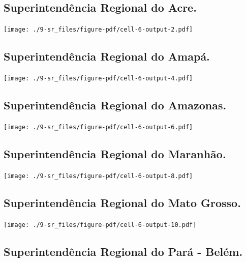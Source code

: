 \documentclass[
  letterpaper,
]{report}
\begin{document}
\hypertarget{superintenduxeancia-regional-do-acre.-1}{%
\subsection{Superintendência Regional do
Acre.}\label{superintenduxeancia-regional-do-acre.-1}}

\texttt{[image: ./9-sr\_files/figure-pdf/cell-6-output-2.pdf]}

\hypertarget{superintenduxeancia-regional-do-amapuxe1.-1}{%
\subsection{Superintendência Regional do
Amapá.}\label{superintenduxeancia-regional-do-amapuxe1.-1}}

\texttt{[image: ./9-sr\_files/figure-pdf/cell-6-output-4.pdf]}

\hypertarget{superintenduxeancia-regional-do-amazonas.-1}{%
\subsection{Superintendência Regional do
Amazonas.}\label{superintenduxeancia-regional-do-amazonas.-1}}

\texttt{[image: ./9-sr\_files/figure-pdf/cell-6-output-6.pdf]}

\hypertarget{superintenduxeancia-regional-do-maranhuxe3o.-1}{%
\subsection{Superintendência Regional do
Maranhão.}\label{superintenduxeancia-regional-do-maranhuxe3o.-1}}

\texttt{[image: ./9-sr\_files/figure-pdf/cell-6-output-8.pdf]}

\hypertarget{superintenduxeancia-regional-do-mato-grosso.-1}{%
\subsection{Superintendência Regional do Mato
Grosso.}\label{superintenduxeancia-regional-do-mato-grosso.-1}}

\texttt{[image: ./9-sr\_files/figure-pdf/cell-6-output-10.pdf]}

\hypertarget{superintenduxeancia-regional-do-paruxe1---beluxe9m.-1}{%
\subsection{Superintendência Regional do Pará -
Belém.}\label{superintenduxeancia-regional-do-paruxe1---beluxe9m.-1}}
\end{document}
